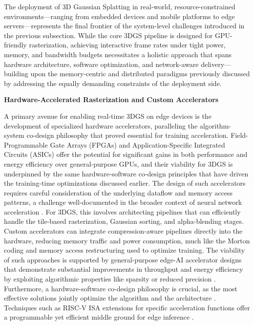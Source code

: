 \documentclass[11pt]{article}
\begin{document}
The deployment of 3D Gaussian Splatting in real-world, resource-constrained environments---ranging from embedded devices and mobile platforms to edge servers---represents the final frontier of the system-level challenges introduced in the previous subsection. While the core 3DGS pipeline is designed for GPU-friendly rasterization, achieving interactive frame rates under tight power, memory, and bandwidth budgets necessitates a holistic approach that spans hardware architecture, software optimization, and network-aware delivery---building upon the memory-centric and distributed paradigms previously discussed by addressing the equally demanding constraints of the deployment side.

\textbf{Hardware-Accelerated Rasterization and Custom Accelerators}

A primary avenue for enabling real-time 3DGS on edge devices is the development of specialized hardware accelerators, paralleling the algorithm-system co-design philosophy that proved essential for training acceleration. Field-Programmable Gate Arrays (FPGAs) and Application-Specific Integrated Circuits (ASICs) offer the potential for significant gains in both performance and energy efficiency over general-purpose GPUs, and their viability for 3DGS is underpinned by the same hardware-software co-design principles that have driven the training-time optimizations discussed earlier. The design of such accelerators requires careful consideration of the underlying dataflow and memory access patterns, a challenge well-documented in the broader context of neural network acceleration \cite{ref474,ref475}. For 3DGS, this involves architecting pipelines that can efficiently handle the tile-based rasterization, Gaussian sorting, and alpha-blending stages. Custom accelerators can integrate compression-aware pipelines directly into the hardware, reducing memory traffic and power consumption, much like the Morton coding and memory access restructuring used to optimize training. The viability of such approaches is supported by general-purpose edge-AI accelerator designs that demonstrate substantial improvements in throughput and energy efficiency by exploiting algorithmic properties like sparsity or reduced precision \cite{ref476,ref477}. Furthermore, a hardware-software co-design philosophy is crucial, as the most effective solutions jointly optimize the algorithm and the architecture \cite{ref478,ref479}. Techniques such as RISC-V ISA extensions for specific acceleration functions offer a programmable yet efficient middle ground for edge inference \cite{ref480}.
\end{document}
